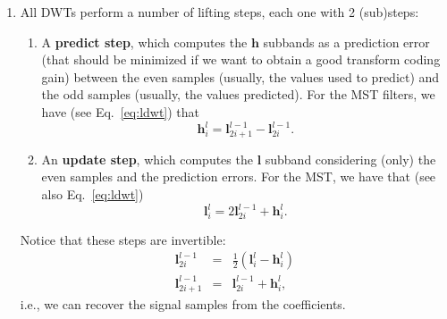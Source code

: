 \begin{enumerate}
  The $l$-levels DWT splits the signal spectrum into $l+1$ subbands. If
  $l=n$, where $N=2^n,$ we have the spectrum partition (decomposition)
  \begin{equation*}
        | \mathbf{l}^l_0 | \mathbf{h}^l_0 | \mathbf{h}^{l-1}_0 \mathbf{h}^{l-1}_1 | \mathbf{h}^{l-2}_0 \mathbf{h}^{l-2}_1 \mathbf{h}^{l-2}_2 \mathbf{h}^{l-2}_3 | \cdots | \mathbf{h}^1_0 \mathbf{h}^1_1 \cdots \mathbf{h}^1_{2^{n-1}-1} |,
  \end{equation*}
  holding\footnote{The wavelet coefficient ${\mathbf l}^l_0$ is called the DC
    (Direct Current) coefficient, and the rest of ${\mathbf h}$
    coefficients are called AC (Alternating Current) coefficients.} that
  \begin{equation}
    1+\sum_{j=1}^l 2^{j-1}=2^n,
  \end{equation}
  i.e., the number of DWT coefficients is also $N$.

\item All DWTs perform a number of lifting steps, each one with
  2 (sub)steps:
  \begin{enumerate}
  \item A \textbf{predict step}, which computes the ${\mathbf h}$
    subbands as a prediction error (that should be minimized if we
    want to obtain a good transform coding gain) between the even
    samples (usually, the values used to predict) and the odd samples
    (usually, the values predicted). For the MST filters, we have
    (see Eq.~\eqref{eq:ldwt}) that
    \begin{equation}
      {\mathbf h}^l_i = {\mathbf l}^{l-1}_{2i+1} - {\mathbf l}^{l-1}_{2i}.
    \end{equation}
    
  \item An \textbf{update step}, which computes the ${\mathbf l}$
    subband considering (only) the even samples and the prediction
    errors. For the MST, we have that (see also Eq.~\eqref{eq:ldwt})
    \begin{equation}
      {\mathbf l}^l_i = 2{\mathbf l}^{l-1}_{2i} + {\mathbf h}^l_i.
    \end{equation}
  \end{enumerate}

  Notice that these steps are invertible:
  \begin{equation}
    \begin{array}{rcl}
      {\mathbf l}^{l-1}_{2i} & = & \frac{1}{2}({\mathbf l}^l_i - {\mathbf h}^l_i)\\
      {\mathbf l}^{l-1}_{2i+1} & = & {\mathbf l}^{l-1}_{2i} + {\mathbf h}^l_i,
    \end{array}
  \end{equation}
  i.e., we can recover the signal samples from the coefficients.

\end{enumerate}

